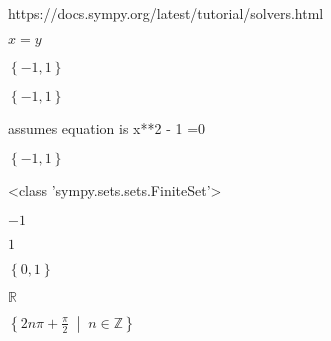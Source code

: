 \documentclass{article}
\begin{document}
https://docs.sympy.org/latest/tutorial/solvers.html
 
\bigskip
$x = y$
 
\bigskip
$\left\{-1, 1\right\}$
 
\bigskip
$\left\{-1, 1\right\}$
 
\bigskip
assumes equation is x**2 - 1 =0
 
\bigskip
$\left\{-1, 1\right\}$
 
\bigskip
<class 'sympy.sets.sets.FiniteSet'>
 
\bigskip
$-1$
 
\bigskip
$1$
 
\bigskip
$\left\{0, 1\right\}$
 
\bigskip
$\mathbb{R}$
 
\bigskip
$\left\{2 n \pi + \frac{\pi}{2}\; \middle|\; n \in \mathbb{Z}\right\}$
 
\bigskip
\end{document}
